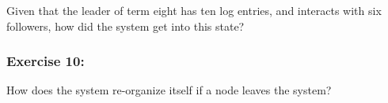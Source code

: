 \documentclass[12pt,a4paper]{article}
\begin{document}
Given that the leader of term eight has ten log entries, and interacts with six followers, how did the system get into this state?

\subsubsection*{Exercise 10:} How does the system re-organize itself if a node leaves the system?




\end{document}
